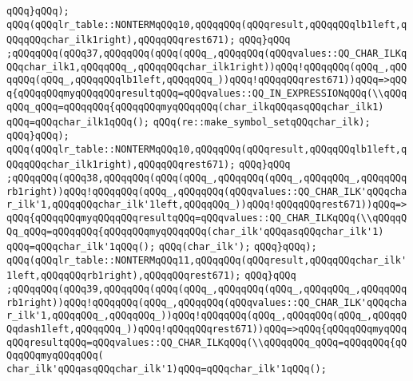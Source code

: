 \verb|qQQq}qQQq);|\newline
\verb|qQQq(qQQqlr_table::NONTERMqQQq10,qQQqqQQq(qQQqresult,qQQqqQQqlb1left,qQQqqQQqchar_ilk1right),qQQqqQQqrest671);|\newline
\verb|qQQq}qQQq|\newline
\verb|;qQQqqQQq(qQQq37,qQQqqQQq(qQQq(qQQq_,qQQqqQQq(qQQqvalues::QQ_CHAR_ILKqQQqchar_ilk1,qQQqqQQq_,qQQqqQQqchar_ilk1right))qQQq!qQQqqQQq(qQQq_,qQQqqQQq(qQQq_,qQQqqQQqlb1left,qQQqqQQq_))qQQq!qQQqqQQqrest671))qQQq=>qQQq{qQQqqQQqmyqQQqqQQqresultqQQq=qQQqvalues::QQ_IN_EXPRESSIONqQQq(\\qQQqqQQq_qQQq=qQQqqQQq{qQQqqQQqmyqQQqqQQq(char_ilkqQQqasqQQqchar_ilk1)|\newline
\verb|qQQq=qQQqchar_ilk1qQQq();|\newline
\verb|qQQq(re::make_symbol_setqQQqchar_ilk);|\newline
\verb|qQQq}qQQq);|\newline
\verb|qQQq(qQQqlr_table::NONTERMqQQq10,qQQqqQQq(qQQqresult,qQQqqQQqlb1left,qQQqqQQqchar_ilk1right),qQQqqQQqrest671);|\newline
\verb|qQQq}qQQq|\newline
\verb|;qQQqqQQq(qQQq38,qQQqqQQq(qQQq(qQQq_,qQQqqQQq(qQQq_,qQQqqQQq_,qQQqqQQqrb1right))qQQq!qQQqqQQq(qQQq_,qQQqqQQq(qQQqvalues::QQ_CHAR_ILK'qQQqchar_ilk'1,qQQqqQQqchar_ilk'1left,qQQqqQQq_))qQQq!qQQqqQQqrest671))qQQq=>qQQq{qQQqqQQqmyqQQqqQQqresultqQQq=qQQqvalues::QQ_CHAR_ILKqQQq(\\qQQqqQQq_qQQq=qQQqqQQq{qQQqqQQqmyqQQqqQQq(char_ilk'qQQqasqQQqchar_ilk'1)|\newline
\verb|qQQq=qQQqchar_ilk'1qQQq();|\newline
\verb|qQQq(char_ilk');|\newline
\verb|qQQq}qQQq);|\newline
\verb|qQQq(qQQqlr_table::NONTERMqQQq11,qQQqqQQq(qQQqresult,qQQqqQQqchar_ilk'1left,qQQqqQQqrb1right),qQQqqQQqrest671);|\newline
\verb|qQQq}qQQq|\newline
\verb|;qQQqqQQq(qQQq39,qQQqqQQq(qQQq(qQQq_,qQQqqQQq(qQQq_,qQQqqQQq_,qQQqqQQqrb1right))qQQq!qQQqqQQq(qQQq_,qQQqqQQq(qQQqvalues::QQ_CHAR_ILK'qQQqchar_ilk'1,qQQqqQQq_,qQQqqQQq_))qQQq!qQQqqQQq(qQQq_,qQQqqQQq(qQQq_,qQQqqQQqdash1left,qQQqqQQq_))qQQq!qQQqqQQqrest671))qQQq=>qQQq{qQQqqQQqmyqQQqqQQqresultqQQq=qQQqvalues::QQ_CHAR_ILKqQQq(\\qQQqqQQq_qQQq=qQQqqQQq{qQQqqQQqmyqQQqqQQq(|\newline
\verb|char_ilk'qQQqasqQQqchar_ilk'1)qQQq=qQQqchar_ilk'1qQQq();|\newline
